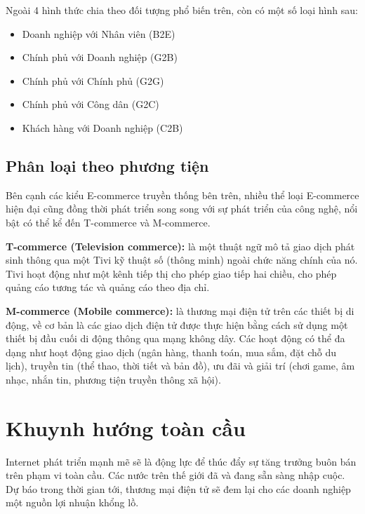 \documentclass[12pt]{article}
\begin{document}
Ngoài 4 hình thức chia theo đối tượng phổ biến trên, còn có một số loại hình sau:

\begin{itemize}
    \item Doanh nghiệp với Nhân viên (B2E)
    \item Chính phủ với Doanh nghiệp (G2B)
    \item Chính phủ với Chính phủ (G2G)
    \item Chính phủ với Công dân (G2C)
    \item Khách hàng với Doanh nghiệp (C2B)
\end{itemize}
\subsection{Phân loại theo phương tiện}
Bên cạnh các kiểu E-commerce truyền thống bên trên, nhiều thể loại E-commerce hiện đại cũng đồng thời phát triển song song với sự phát triển của công nghệ, nổi bật có thể kể đến T-commerce và M-commerce.

\textbf{T-commerce (Television commerce):} là một thuật ngữ mô tả giao dịch phát sinh thông qua một Tivi kỹ thuật số (thông minh) ngoài chức năng chính của nó. Tivi hoạt động như một kênh tiếp thị cho phép giao tiếp hai chiều, cho phép quảng cáo tương tác và quảng cáo theo địa chỉ.

\textbf{M-commerce (Mobile commerce):} là thương mại điện tử trên các thiết bị di động, về cơ bản là các giao dịch điện tử được thực hiện bằng cách sử dụng một thiết bị đầu cuối di động thông qua mạng không dây. Các hoạt động có thể đa dạng như hoạt động giao dịch (ngân hàng, thanh toán, mua sắm, đặt chỗ du lịch), truyền tin (thể thao, thời tiết và bản đồ), ưu đãi và giải trí (chơi game, âm nhạc, nhắn tin, phương tiện truyền thông xã hội).

\section{Khuynh hướng toàn cầu}
Internet phát triển mạnh mẽ sẽ là động lực để thúc đẩy sự tăng tr­ưởng buôn bán trên phạm vi toàn cầu. Các n­ước trên thế giới đã và đang sẵn sàng nhập cuộc. Dự báo trong thời gian tới, thư­ơng mại điện tử sẽ đem lại cho các doanh nghiệp một nguồn lợi nhuận khổng lồ.
\end{document}
